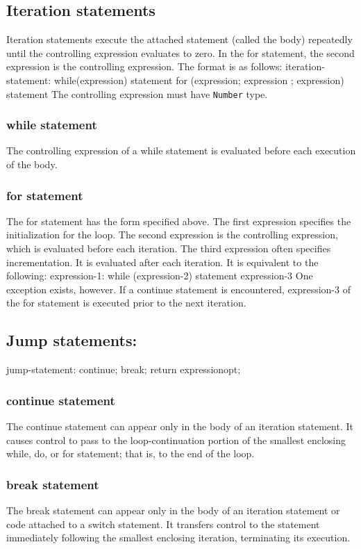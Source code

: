 \documentclass[12pt,A4]{book}
\begin{document}
\subsection{Iteration statements}
Iteration statements execute the attached statement (called the body) repeatedly until the controlling expression evaluates to zero.  In the for statement, the second expression is the controlling expression.  The format is as follows:
iteration-statement:        while(expression) statement
            for (expression; expression ; expression) statement
The controlling expression must have \verb|Number| type.
\subsubsection{while statement}
The controlling expression of a while statement is evaluated before each execution of the body.
\subsubsection{for statement}
The for statement has the form specified above.  The first expression specifies the initialization for the loop.  The second expression is the controlling expression, which is evaluated before each iteration.  The third expression often specifies incrementation.  It is evaluated after each iteration. It is equivalent to the following:
expression-1:    while (expression-2) {statement expression-3}
One exception exists, however.  If a continue statement is encountered, expression-3 of the for statement is executed prior to the next iteration.
\subsection{Jump statements:}
jump-statement:        continue;
                break;
                return expressionopt;
\subsubsection{continue statement}
The continue statement can appear only in the body of an iteration statement.  It causes control to pass to the loop-continuation portion of the smallest enclosing while, do, or for statement; that is, to the end of the loop.
\subsubsection{break statement}
The break statement can appear only in the body of an iteration statement or code attached to a switch statement. It transfers control to the statement immediately following the smallest enclosing iteration, terminating its execution.
\end{document}
